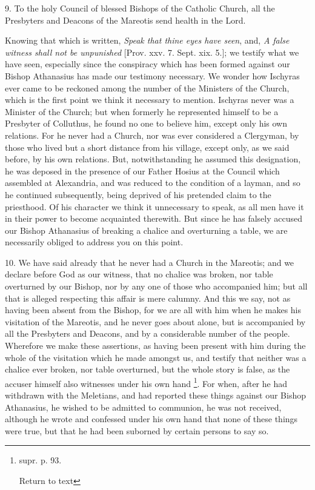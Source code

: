 9. To the holy Council of blessed Bishops of the
Catholic Church, all the Presbyters and Deacons of the Mareotis send
health in the Lord.

Knowing that which is written, \emph{Speak that
thine eyes have seen}, and, \emph{A false witness shall not be
unpunished} [Prov. xxv. 7. Sept. xix. 5.]; we testify what we have
seen, especially since the conspiracy which has been formed against
our Bishop Athanasius has made our testimony necessary. We wonder how
Ischyras ever came to be reckoned among the number of the Ministers of
the Church, which is the first point we think it necessary to mention.
Ischyras never was a Minister of the Church; but when formerly he
represented himself to be a Presbyter of Colluthus, he found no one to
believe him, except only his own relations. For he never had a Church,
nor was ever considered a Clergyman, by those who lived but a short
distance from his village, except only, as we said before, by his own
relations. But, notwithstanding he assumed this designation, he was
deposed in the presence of our Father Hosius at the Council which
assembled at Alexandria, and was reduced to the condition of a
layman, and so he continued subsequently, being deprived of his
pretended claim to the priesthood. Of his character we think it
unnecessary to speak, as all men have it in their power to become
acquainted therewith. But since he has falsely accused our Bishop
Athanasius of breaking a chalice and overturning a table, we are
necessarily obliged to address you on this point.

10. We have said already that he never had a
Church in the Mareotis; and we declare before God as our witness, that
no chalice was broken, nor table overturned by our Bishop, nor by any
one of those who accompanied him; but all that is alleged respecting
this affair is mere calumny. And this we say, not as having been
absent from the Bishop, for we are all with him when he makes his
visitation of the Mareotis, and he never goes about alone, but is
accompanied by all the Presbyters and Deacons, and by a considerable
number of the people. Wherefore we make these assertions, as having
been present with him during the whole of the visitation which he made
amongst us, and testify that neither was a chalice ever broken, nor
table overturned, but the whole story is false, as the accuser himself
also witnesses under his own hand \footnote{supr. p. 93.

Return to text}. For when, after he had withdrawn with the Meletians, and had
reported these things against our Bishop Athanasius, he wished to be
admitted to communion, he was not received, although he wrote and
confessed under his own hand that none of these things were true, but
that he had been suborned by certain persons to say so.

